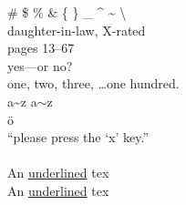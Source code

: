 \documentclass{article}
\begin{document}
\# \$ \% \& \{ \} \_ \^{} \~{} \textbackslash \\
daughter-in-law, X-rated\\
pages 13--67\\
yes---or no?\\
one, two, three, \ldots one hundred.\\
a\~{}z \qquad a$\sim$z\\
\"o\\
``please press the `x' key.''\\
\LaTeXe\\
An \underline{underlined} tex\\
An \uline{underlined} tex
\end{document}
